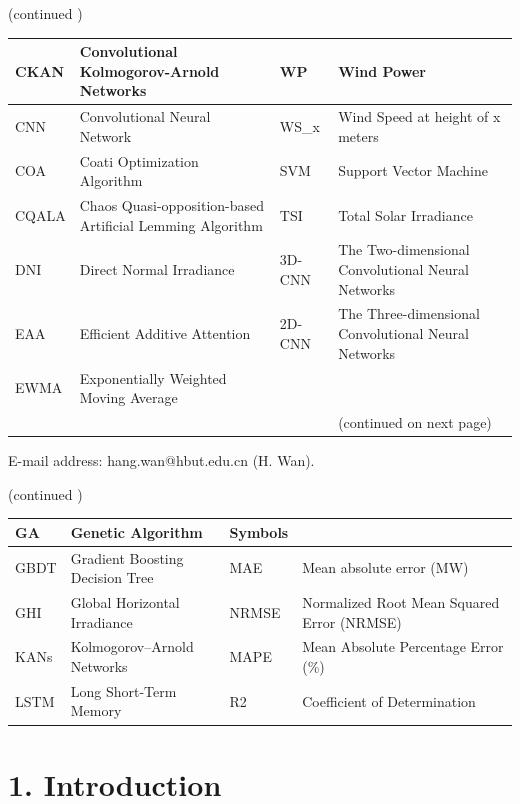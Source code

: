 \documentclass[
  10
]{article}
\newcounter{none} %
\begin{document}
(continued )

{\def\LTcaptype{none} %
\begin{longtable}[]{@{}|l|l|l|l|@{}}
\toprule\noalign{}
\endhead
\bottomrule\noalign{}
\endlastfoot
\hline
CKAN & Convolutional Kolmogorov-Arnold Networks & WP & Wind Power \\
\hline
CNN & Convolutional Neural Network & WS\_x & Wind Speed at height of x
meters \\
\hline
COA & Coati Optimization Algorithm & SVM & Support Vector Machine \\
\hline
CQALA & Chaos Quasi-opposition-based Artificial Lemming Algorithm & TSI
& Total Solar Irradiance \\
\hline
DNI & Direct Normal Irradiance & 3D-CNN & The Two-dimensional
Convolutional Neural Networks \\
\hline
EAA & Efficient Additive Attention & 2D-CNN & The Three-dimensional
Convolutional Neural Networks \\
\hline
EWMA & Exponentially Weighted Moving Average & & \\
\hline
& & & (continued on next page) \\
\hline
\end{longtable}
}

E-mail address: hang.wan@hbut.edu.cn (H. Wan).

(continued )

{\def\LTcaptype{none} %
\begin{longtable}[]{@{}|l|l|l|l|@{}}
\toprule\noalign{}
\endhead
\bottomrule\noalign{}
\endlastfoot
\hline
GA & Genetic Algorithm & Symbols & \\
\hline
GBDT & Gradient Boosting Decision Tree & MAE & Mean absolute error
(MW) \\
\hline
GHI & Global Horizontal Irradiance & NRMSE & Normalized Root Mean
Squared Error (NRMSE) \\
\hline
KANs & Kolmogorov--Arnold Networks & MAPE & Mean Absolute Percentage
Error (\%) \\
\hline
LSTM & Long Short-Term Memory & R2 & Coefficient of Determination \\
\hline
\end{longtable}
}

\section{1. Introduction}\label{introduction}
\end{document}
